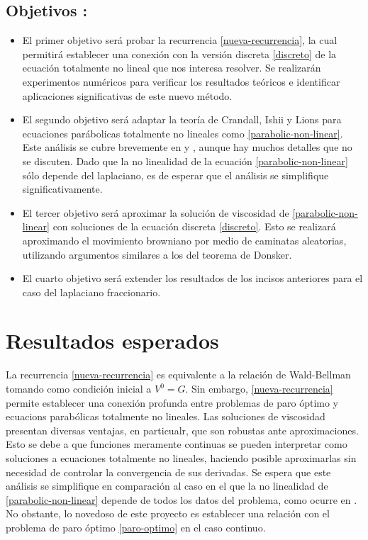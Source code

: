 \documentclass{article}
\numberwithin{equation}{section}
\begin{document}
\subsection*{Objetivos : } 
\begin{itemize}
    \item El primer objetivo será probar la recurrencia \eqref{nueva-recurrencia}, la cual permitirá establecer una conexión con la versión discreta \eqref{discreto} de la ecuación totalmente no lineal que nos interesa resolver. Se realizarán experimentos numéricos para verificar los resultados teóricos e identificar aplicaciones significativas de este nuevo método.
    \item El segundo objetivo será adaptar la teoría de Crandall, Ishii y Lions \cite{crandall1992users} para ecuaciones parábolicas totalmente no lineales como \eqref{parabolic-non-linear}. Este análisis se cubre brevemente en \cite{crandall1992users} y \cite{peng2010nonlinear}, aunque hay muchos detalles que no se discuten. Dado que la no linealidad de la ecuación \eqref{parabolic-non-linear} sólo depende del laplaciano, es de esperar que el análisis se simplifique significativamente. 
    \item El tercer objetivo será aproximar la solución de viscosidad de \eqref{parabolic-non-linear} con soluciones de la ecuación discreta \eqref{discreto}. Esto se realizará aproximando el movimiento browniano por medio de caminatas aleatorias, utilizando argumentos similares a los del teorema de Donsker.
    \item El cuarto objetivo será extender los resultados de los incisos anteriores para el caso del laplaciano fraccionario. 
\end{itemize}

\section{Resultados esperados}

La recurrencia \eqref{nueva-recurrencia} es equivalente a la relación de Wald-Bellman tomando como condición inicial a $V^0 = G$. Sin embargo, \eqref{nueva-recurrencia} permite establecer una conexión profunda entre problemas de paro óptimo y ecuacions parabólicas totalmente no lineales. Las soluciones de viscosidad presentan diversas ventajas, en particualr, que son robustas ante aproximaciones. Esto se debe a que funciones meramente continuas se pueden interpretar como soluciones a ecuaciones totalmente no lineales, haciendo posible aproximarlas sin necesidad de controlar la convergencia de sus derivadas. Se espera que este análisis se simplifique en comparación al caso en el que la no linealidad de \eqref{parabolic-non-linear} depende de todos los datos del problema, como ocurre en \cite{katzourakis2014introduction}. No obstante, lo novedoso de este proyecto es establecer una relación con el problema de paro óptimo \eqref{paro-optimo} en el caso continuo.  
\end{document}
